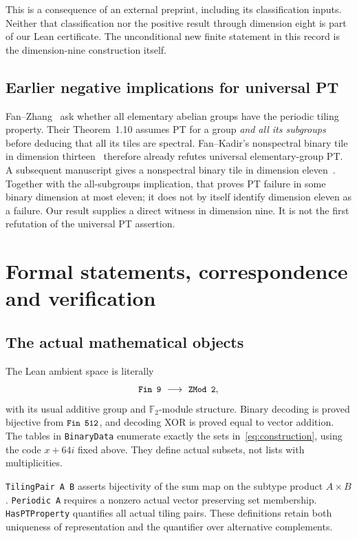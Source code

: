 \documentclass[11pt]{article}
\theoremstyle{definition}\newtheorem{definition}[theorem]{Definition}
\theoremstyle{remark}\newtheorem{remark}[theorem]{Remark}
\newcommand{\F}{\mathbb F}
\newcommand{\code}[1]{\texttt{\small #1}}
\begin{document}
This is a consequence of an external preprint, including its classification inputs. Neither that classification nor the positive result through dimension eight is part of our Lean certificate. The unconditional new finite statement in this record is the dimension-nine construction itself.

\subsection{Earlier negative implications for universal PT}

Fan--Zhang~\cite{fz} ask whether all elementary abelian groups have the periodic tiling property. Their Theorem~1.10 assumes PT for a group \emph{and all its subgroups} before deducing that all its tiles are spectral. Fan--Kadir's nonspectral binary tile in dimension thirteen~\cite{fk} therefore already refutes universal elementary-group PT. A subsequent manuscript gives a nonspectral binary tile in dimension eleven~\cite{mm}. Together with the all-subgroups implication, that proves PT failure in some binary dimension at most eleven; it does not by itself identify dimension eleven as a failure. Our result supplies a direct witness in dimension nine. It is not the first refutation of the universal PT assertion.

\section{Formal statements, correspondence and verification}\label{sec:formal}

\subsection{The actual mathematical objects}

The Lean ambient space is literally
\[
\code{Fin 9}\ \longrightarrow\ \code{ZMod 2},
\]
with its usual additive group and $\F_2$-module structure. Binary decoding is proved bijective from $\code{Fin 512}$, and decoding XOR is proved equal to vector addition. The tables in \code{BinaryData} enumerate exactly the sets in~\eqref{eq:construction}, using the code $x+64i$ fixed above. They define actual subsets, not lists with multiplicities.

\code{TilingPair A B} asserts bijectivity of the sum map on the subtype product $A\times B$. \code{Periodic A} requires a nonzero actual vector preserving set membership. \code{HasPTProperty} quantifies all actual tiling pairs. These definitions retain both uniqueness of representation and the quantifier over alternative complements.
\end{document}
